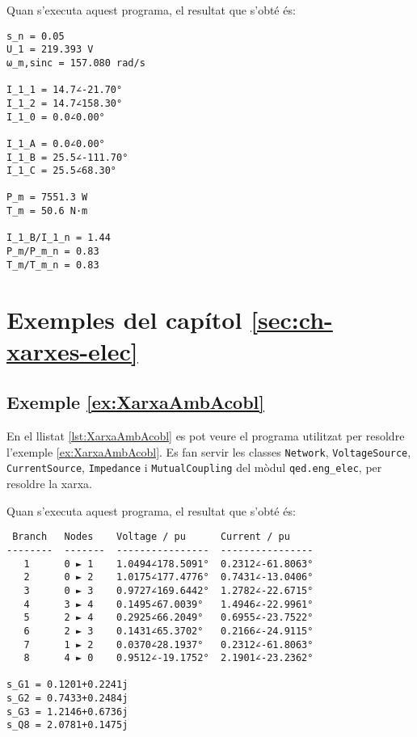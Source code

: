 Quan s'executa aquest programa, el resultat que s'obté és:
\lstset{
	language=,
	numbers=none,
	frame=none
}
\begin{lstlisting}
s_n = 0.05
U_1 = 219.393 V
ω_m,sinc = 157.080 rad/s

I_1_1 = 14.7∠-21.70°
I_1_2 = 14.7∠158.30°
I_1_0 = 0.0∠0.00°

I_1_A = 0.0∠0.00°
I_1_B = 25.5∠-111.70°
I_1_C = 25.5∠68.30°

P_m = 7551.3 W
T_m = 50.6 N·m

I_1_B/I_1_n = 1.44
P_m/P_m_n = 0.83
T_m/T_m_n = 0.83	
\end{lstlisting} 



\section{Exemples del capítol \ref*{sec:ch-xarxes-elec}}

\hypertarget{exemple:XarxaAmbAcobl}{\subsection{Exemple \ref*{ex:XarxaAmbAcobl} \XarxaAmbAcobl}}
En el llistat \vref{lst:XarxaAmbAcobl} es pot veure el programa utilitzat per resoldre l'exemple \vref{ex:XarxaAmbAcobl}. Es fan servir les classes \texttt{Network},  \texttt{VoltageSource}, \texttt{CurrentSource}, \texttt{Impedance} i \texttt{MutualCoupling} del mòdul \texttt{qed.eng\_elec},  per resoldre la xarxa.

\break



Quan s'executa aquest programa, el resultat que s'obté és:
\lstset{
	language=,
	numbers=none,
	frame=none
}
\begin{lstlisting}
 Branch   Nodes    Voltage / pu      Current / pu
--------  -------  ----------------  ----------------
   1      0 ► 1    1.0494∠178.5091°  0.2312∠-61.8063°
   2      0 ► 2    1.0175∠177.4776°  0.7431∠-13.0406°
   3      0 ► 3    0.9727∠169.6442°  1.2782∠-22.6715°
   4      3 ► 4    0.1495∠67.0039°   1.4946∠-22.9961°
   5      2 ► 4    0.2925∠66.2049°   0.6955∠-23.7522°
   6      2 ► 3    0.1431∠65.3702°   0.2166∠-24.9115°
   7      1 ► 2    0.0370∠28.1937°   0.2312∠-61.8063°
   8      4 ► 0    0.9512∠-19.1752°  2.1901∠-23.2362°

s_G1 = 0.1201+0.2241j
s_G2 = 0.7433+0.2484j
s_G3 = 1.2146+0.6736j
s_Q8 = 2.0781+0.1475j
\end{lstlisting} 


